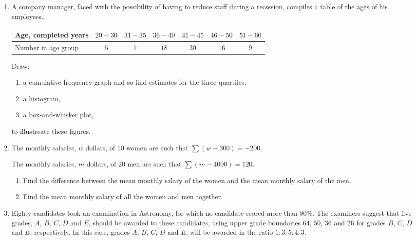 \mis

\begin{enumerate}
	
	\item  A company manager, faced with the possibility of having to reduce staff during a recsssion, compiles a table of the ages of his employees.
	
	 \medskip
	
	\renewcommand{\arraystretch}{1.2} %
	\begin{tabular}{|l|c|c|c|c|c|c|}
		\hline
		Age, completed years   & $ 20-30 $ & $ 31-35 $ & $ 36-40 $ & $ 41-45 $ & $ 46-50 $  & $51-60$  \\ 
		\hline
		Number in age group & $5$ & $7$ & $18$ & $30$ & $16$ & $9$ \\ 
		\hline
	\end{tabular}

   \medskip
   
   Draw:
   \begin{enumerate}
   	\item a cumulative frequency graph and so find estimates for the three quartiles,
   	\item a histogram,
   	\item a box-and-whisker plot,
   \end{enumerate}
   to illustreate these figures.
	
	



   \item   The monthly salaries, $w$ dollars, of $10$ women are such that $\displaystyle \sum (w-300) = -200$. 

The monthly salaries, $m$ dollars, of $20$ men are such that $\displaystyle \sum (m-4000) =120$.

\begin{enumerate}
	\item Find the difference between the mean monthly salary of the women and the mean monthly salary of the men.
	\item Find the mean monthly salary of all the women and men together.
\end{enumerate}


\item Eighty candidates took an examination in Astronomy, for which no candidate scored more than $80\%$. The examiners suggest that five grades, $A$, $B$, $C$, $D$ and $E$, should be awarded to these candidates, using upper grade boundaries $64$, $50$, $36$ and $26$ for grades $B$, $C$, $D$ and $E$, respectively. In this case, grades $A$, $B$, $C$, $D$ and $E$, will be awarded in the ratio $1:3:5:4:3$.


\end{enumerate}
